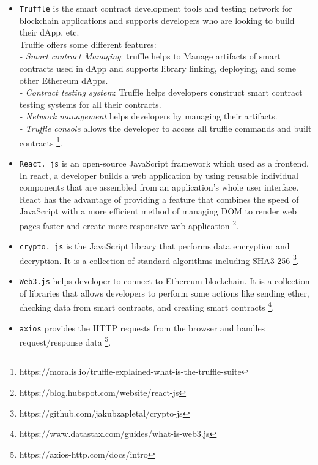 \begin{itemize}
  \item \texttt{Truffle} is the smart contract development tools and testing network for blockchain applications and supports developers who are looking to build their dApp, etc. \\
 Truffle offers some different features: \\
 \textit{- Smart contract Managing}: truffle helps to Manage artifacts of smart contracts used in dApp and supports library linking, deploying, and some other Ethereum dApps. \\
 \hspace{3cm} \textit{- Contract testing system}: Truffle helps developers construct smart contract testing systems for all their contracts. \\
 \textit{- Network management} helps developers by managing their artifacts. \\
 \textit{- Truffle console} allows the developer to access all truffle commands and built contracts \footnote{https://moralis.io/truffle-explained-what-is-the-truffle-suite}.
\\
\item \texttt{React. js} is an open-source JavaScript framework which used as a frontend. In react, a developer builds a web application by using reusable individual components that are assembled from an application's whole user interface.\\
React has the advantage of providing a feature that combines the speed of JavaScript with a more efficient method of managing DOM to render web pages faster and create more responsive web application \footnote{https://blog.hubspot.com/website/react-js}.\\
\item \texttt{crypto. js} is the JavaScript library that performs data encryption and decryption. It is a collection of standard algorithms including SHA3-256 \footnote{{https://github.com/jakubzapletal/crypto-js}}.
\item \texttt{Web3.js} helps developer to connect to Ethereum blockchain. It is a collection of libraries that allows developers to perform some actions like sending ether, checking data from smart contracts, and creating smart contracts \footnote{https://www.datastax.com/guides/what-is-web3.js}.\\
\item \texttt{axios} provides the HTTP requests from the browser and handles request/response data \footnote{https://axios-http.com/docs/intro}. \\

\end{itemize}
